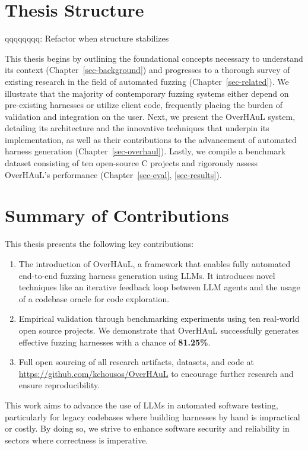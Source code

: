\documentclass[
  a4paper,
]{scrreprt}
\providecommand{\tightlist}{%
  \setlength{\itemsep}{0pt}\setlength{\parskip}{0pt}}
\theoremstyle{definition}
\theoremstyle{remark}
\begin{document}
\section{Thesis Structure}\label{thesis-structure}

qqqqqqqq: Refactor when structure stabilizes

This thesis begins by outlining the foundational concepts necessary to
understand its context (Chapter~\ref{sec-background}) and progresses to
a thorough survey of existing research in the field of automated fuzzing
(Chapter~\ref{sec-related}). We illustrate that the majority of
contemporary fuzzing systems either depend on pre-existing harnesses or
utilize client code, frequently placing the burden of validation and
integration on the user. Next, we present the OverHAuL system, detailing
its architecture and the innovative techniques that underpin its
implementation, as well as their contributions to the advancement of
automated harness generation (Chapter~\ref{sec-overhaul}). Lastly, we
compile a benchmark dataset consisting of ten open-source C projects and
rigorously assess OverHAuL's performance
(Chapter~\ref{sec-eval}, \ref{sec-results}).

\section{Summary of Contributions}\label{summary-of-contributions}

This thesis presents the following key contributions:

\begin{enumerate}
\def\labelenumi{\arabic{enumi}.}
\tightlist
\item
  The introduction of OverHAuL, a framework that enables fully automated
  end-to-end fuzzing harness generation using LLMs. It introduces novel
  techniques like an iterative feedback loop between LLM agents and the
  usage of a codebase oracle for code exploration.
\item
  Empirical validation through benchmarking experiments using ten
  real-world open source projects. We demonstrate that OverHAuL
  successfully generates effective fuzzing harnesses with a chance of
  \textbf{81.25\%}.
\item
  Full open sourcing of all research artifacts, datasets, and code at
  \url{https://github.com/kchousos/OverHAuL} to encourage further
  research and ensure reproducibility.
\end{enumerate}

This work aims to advance the use of LLMs in automated software testing,
particularly for legacy codebases where building harnesses by hand is
impractical or costly. By doing so, we strive to enhance software
security and reliability in sectors where correctness is imperative.
\end{document}
